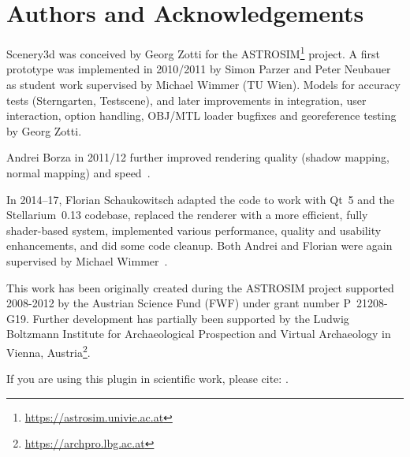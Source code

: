 \section*{Authors and Acknowledgements}
\label{sec:scenery3d:Acknowledgments}


Scenery3d was conceived by Georg Zotti for the
ASTROSIM\footnote{\url{https://astrosim.univie.ac.at}} project. A first
prototype was implemented in 2010/2011 by Simon Parzer and
Peter Neubauer as student work supervised by Michael Wimmer (TU Wien).
Models for accuracy tests (Sterngarten, Testscene), and later
improvements in integration, user interaction,  option handling,
OBJ/MTL loader bugfixes and georeference testing by Georg Zotti.

Andrei Borza in 2011/12 further improved rendering quality (shadow
mapping, normal mapping) and
speed~\citep{Zotti-Neubauer:VSMM2012,Zotti-Neubauer:EuroMed2012,Zotti:2012:SpringerAA}.

In 2014--17,
Florian Schaukowitsch adapted the code to work with Qt~5 and the 
Stellarium~0.13 codebase, replaced the renderer with a more efficient, fully
shader-based system, implemented various performance, quality and usability
enhancements, and did some code cleanup. Both Andrei and Florian were again
supervised by Michael Wimmer~\citep{Zotti:CHNT2015,Zotti:SEAC2015,Zotti:SEAC2017}.

This work has been originally created during the ASTROSIM project supported 2008-2012 by
the Austrian Science Fund (FWF) under grant number P~21208-G19. Further development has
partially been supported by the Ludwig Boltzmann Institute for Archaeological Prospection and Virtual Archaeology in Vienna, Austria\footnote{%
  \url{https://archpro.lbg.ac.at}}.

If you are using this plugin in scientific work, please cite: \citep{Zotti:CHNT2015,Zotti:SEAC2015,Zotti:SEAC2017,Zotti-etal:SIA2016,Zotti:TAG2016,Zotti-etal:JSA2020.6.2}.



